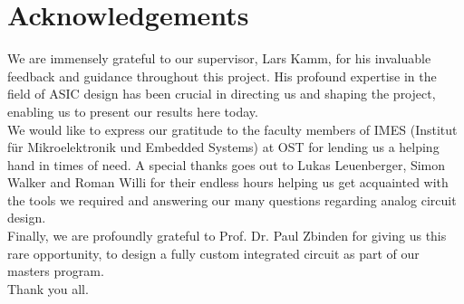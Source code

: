 \section*{\huge Acknowledgements}
\label{chap:danksagung}


We are immensely grateful to our supervisor, Lars Kamm, for his invaluable feedback and guidance throughout this project. His profound expertise in the field of ASIC design has been crucial in directing us and shaping the project, enabling us to present our results here today. \\
We would like to express our gratitude to the faculty members of IMES (Institut für Mikroelektronik und Embedded Systems) at OST for lending us a helping hand in times of need. A special thanks goes out to Lukas Leuenberger, Simon Walker and Roman Willi for their endless hours helping us get acquainted with the tools we required and answering our many questions regarding analog circuit design. \\
Finally, we are profoundly grateful to Prof. Dr. Paul Zbinden for giving us this rare opportunity, to design a fully custom integrated circuit as part of our masters program.\\
Thank you all.

\clearpage